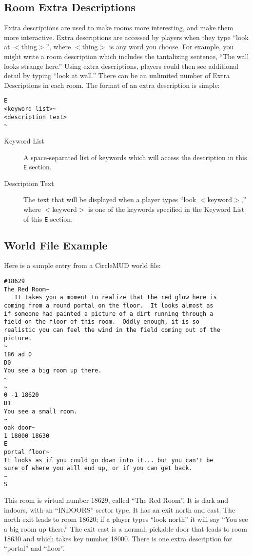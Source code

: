 \documentclass[11pt]{article}
\begin{document}
\subsection{Room Extra Descriptions}
Extra descriptions are used to make rooms more interesting, and make them more interactive.  Extra descriptions are accessed by players when they type ``look at $<$thing$>$'', where $<$thing$>$ is any word you choose. For example, you might write a room description which includes the tantalizing sentence, ``The wall looks strange here.''  Using extra descriptions, players could then see additional detail by typing ``look at wall.''  There can be an unlimited
number of Extra Descriptions in each room.\newline
The format of an extra description is simple:
\begin{verbatim}
E
<keyword list>~
<description text>
~
\end{verbatim}
\begin{description}
\item[Keyword List] A space-separated list of keywords which will access the description in this \texttt{E} section.
\item[Description Text] The text that will be displayed when a player types ``look $<$keyword$>$,'' where $<$keyword$>$ is one of the keywords specified in the Keyword List of this \texttt{E} section.
\end{description}

\subsection{World File Example}
Here is a sample entry from a CircleMUD world file:
\begin{verbatim}
#18629
The Red Room~
   It takes you a moment to realize that the red glow here is
coming from a round portal on the floor.  It looks almost as
if someone had painted a picture of a dirt running through a
field on the floor of this room.  Oddly enough, it is so
realistic you can feel the wind in the field coming out of the
picture.
~
186 ad 0
D0
You see a big room up there.
~
~
0 -1 18620
D1
You see a small room.
~
oak door~
1 18000 18630
E
portal floor~
It looks as if you could go down into it... but you can't be
sure of where you will end up, or if you can get back.
~
S
\end{verbatim}
This room is virtual number 18629, called ``The Red Room''.  It is dark and indoors, with an ``INDOORS'' sector type.  It has an exit north and east.  The north exit leads to room 18620; if a player types ``look north'' it will say ``You see a big room up there.''  The exit east is a normal, pickable door that leads to room 18630 and which takes key number 18000.  There is one extra description for ``portal'' and ``floor''.
\end{document}
